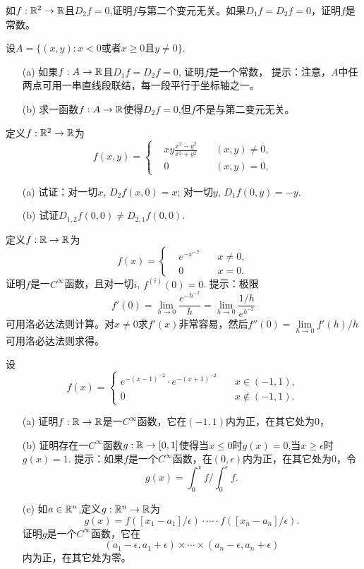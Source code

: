 \begin{problemset}
\item 如$f:\mathbb{R}^2 \to \mathbb{R}$且$D_2f = 0$,证明$f$与第二个变元无关。如果$D_1f=D_2f =0$，证明$f$是常数。

\item 设$A = \{(x, y):x<0\text{或者}x\ge 0\text{且}y \neq 0\}$.
\begin{enumerate}
\item[(a)] 如果$f:A \to \mathbb{R}$且$D_1f=D_2f=0$, 证明$f$是一个常数， 提示：注意，$A$中任两点可用一串直线段联结，每一段平行于坐标轴之一。
\item[(b)] 求一函数$f:A \to \mathbb{R}$使得$D_2f=0$,但$f$不是与第二变元无关。
\end{enumerate}

\item 定义$f:\mathbb{R}^2 \to \mathbb{R}$为
\[
f(x, y) = \left\{
\begin{aligned}
&xy\frac{x^2-y^2}{x^2+y^2}&\quad (x,y) \neq 0,\\
&0&\quad (x,y)=0,
\end{aligned}
\right.
\]
\begin{enumerate}
\item[(a)] 试证：对一切$x$, $D_2f(x, 0) = x$; 对一切$y$, $D_1f(0, y) = -y$.
\item[(b)] 试证$D_{1,2}f(0,0) \neq D_{2,1}f(0,0)$.
\end{enumerate}

\item 定义$f:\mathbb{R} \to \mathbb{R}$为
\[
f(x) = \left\{
\begin{aligned}
&e^{-x^{-2}} &\quad x \neq 0,\\
&0&\quad x = 0.
\end{aligned}
\right.
\]
证明$f$是一$C^{\infty}$函数，且对一切$i$, $f^{(i)}(0) = 0$. 提示：极限
\[
f'(0) = \lim_{h \to 0}{\frac{e^{-h^{-2}}}{h}} = \lim_{h \to 0}{\frac{1/h}{e^{h^{-2}}}}
\]
可用洛必达法则计算。对$x \neq 0$求$f'(x)$非常容易，然后$f''(0)=\lim\limits_{h \to 0}{f'(h)/h}$可用洛必达法则求得。

\item 设
\[
f(x) = \left\{
\begin{aligned}
e^{-(x-1)^{-2}}\cdot e^{-(x+1)^{-2}} &\quad x \in (-1, 1),\\
0\quad&\quad x \notin (-1, 1). 
\end{aligned}
\right.
\]
\begin{enumerate}
\item[(a)] 证明$f:\mathbb{R} \to \mathbb{R}$是一$C^{\infty}$函数，它在$(-1, 1)$内为正，在其它处为0，
\item[(b)] 证明存在一$C^{\infty}$函数$g:\mathbb{R} \to [0, 1]$使得当$x \le 0$时$g(x)=0$,当$x \ge \epsilon$时$g(x)=1$. 提示：如果$f$是一个$C^{\infty}$函数，在$(0, \epsilon)$内为正，在其它处为0，令
\[
g(x)= \int_{0}^{x}{f}/\int_{0}^{\epsilon}{f}.
\]
\item[(c)] 如$a \in \mathbb{R}^n$,定义$g:\mathbb{R}^n \to \mathbb{R}$为
\[
g(x) = f([x_1-a_1]/\epsilon) \cdot \cdots \cdot f([x_n - a_n]/\epsilon).
\]
证明$g$是一个$C^{\infty}$函数，它在
\[
(a_1-\epsilon, a_1+\epsilon) \times \cdots \times (a_n-\epsilon, a_n+\epsilon)
\]
内为正，在其它处为零。


\end{enumerate}
\end{problemset}
